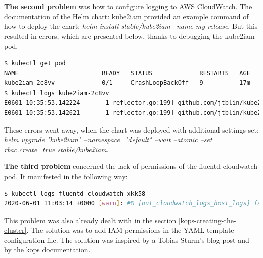 \textbf{The second problem} was how to configure logging to AWS CloudWatch. The documentation of the Helm chart: kube2iam\cite{kube2iam} provided an example command of how to deploy the chart: \textit{helm install stable/kube2iam --name my-release}. But this resulted in errors, which are presented below, thanks to debugging the kube2iam pod.
\begin{lstlisting}[basicstyle=\tiny,caption={Debugging kube2iam pod},captionpos=b,language=Bash,xleftmargin=1cm]
$ kubectl get pod
NAME                       READY   STATUS             RESTARTS   AGE
kube2iam-2c8vv             0/1     CrashLoopBackOff   9          17m
$ kubectl logs kube2iam-2c8vv
E0601 10:35:53.142224       1 reflector.go:199] github.com/jtblin/kube2iam/vendor/k8s.io/client-go/tools/cache/reflector.go:94: Failed to list *v1.Pod: pods is forbidden: User "system:serviceaccount:default:default" cannot list resource "pods" in API group "" at the cluster scope
E0601 10:35:53.142621       1 reflector.go:199] github.com/jtblin/kube2iam/vendor/k8s.io/client-go/tools/cache/reflector.go:94: Failed to list *v1.Namespace: namespaces is forbidden: User "system:serviceaccount:default:default" cannot list resource "namespaces" in API group "" at the cluster scope
\end{lstlisting}

These errors went away, when the chart was deployed with additional settings set: \textit{helm upgrade "kube2iam" --namespace="default" --wait --atomic --set rbac.create=true stable/kube2iam}.

\textbf{The third problem} concerned the lack of permissions of the fluentd-cloudwatch pod. It manifested in the following way:
\begin{lstlisting}[basicstyle=\tiny,caption={Debugging the fluent-cloudwatch pod},captionpos=b,language=Bash,xleftmargin=1cm]
$ kubectl logs fluentd-cloudwatch-xkk58
2020-06-01 11:03:14 +0000 [warn]: #0 [out_cloudwatch_logs_host_logs] failed to flush the buffer. retry_time=8 next_retry_seconds=2020-06-01 11:05:22 +0000 chunk="5a703b5e45c9592f24399f9b73acaf43" error_class=Aws::CloudWatchLogs::Errors::AccessDeniedException error="User: arn:aws:sts::976184668068:assumed-role/nodes.testing.k8s-kops-for-masters-thesis.k8s.local/i-04a926040234f36d6 is not authorized to perform: logs:DescribeLogGroups on resource: arn:aws:logs:eu-west-1:976184668068:log-group::log-stream:"
\end{lstlisting}
This problem was also already dealt with in the section \ref{kops-creating-the-cluster}. The solution was to add IAM permissions in the YAML template configuration file. The solution was inspired by a Tobias Sturm's blog post\cite{kops-logs-cw-tobias} and by the kops documentation\cite{online-kops-iam}.

